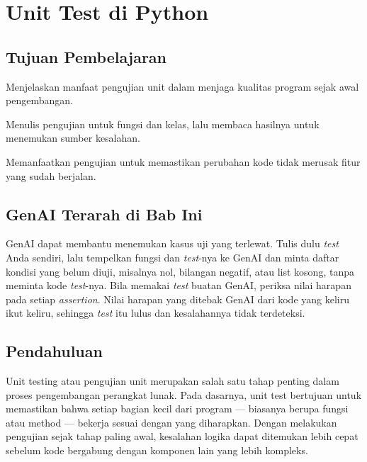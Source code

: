 \chapter{Unit Test di Python}
\label{ch:unit-test-python}

\section*{Tujuan Pembelajaran}
\begin{daftarrapat}
  \item Menjelaskan manfaat pengujian unit dalam menjaga kualitas program sejak awal pengembangan.
  \item Menulis pengujian untuk fungsi dan kelas, lalu membaca hasilnya untuk menemukan sumber kesalahan.
  \item Memanfaatkan pengujian untuk memastikan perubahan kode tidak merusak fitur yang sudah berjalan.
\end{daftarrapat}

\section*{GenAI Terarah di Bab Ini}

GenAI dapat membantu menemukan kasus uji yang terlewat. Tulis dulu \textit{test} Anda sendiri, lalu tempelkan fungsi dan \textit{test}-nya ke GenAI dan minta daftar kondisi yang belum diuji, misalnya nol, bilangan negatif, atau list kosong, tanpa meminta kode \textit{test}-nya. Bila memakai \textit{test} buatan GenAI, periksa nilai harapan pada setiap \textit{assertion}. Nilai harapan yang ditebak GenAI dari kode yang keliru ikut keliru, sehingga \textit{test} itu lulus dan kesalahannya tidak terdeteksi.

\section{Pendahuluan}

Unit testing atau pengujian unit merupakan salah satu tahap penting dalam proses pengembangan perangkat lunak. Pada dasarnya, unit test bertujuan untuk memastikan bahwa setiap bagian kecil dari program — biasanya berupa fungsi atau method — bekerja sesuai dengan yang diharapkan. Dengan melakukan pengujian sejak tahap paling awal, kesalahan logika dapat ditemukan lebih cepat sebelum kode bergabung dengan komponen lain yang lebih kompleks.

